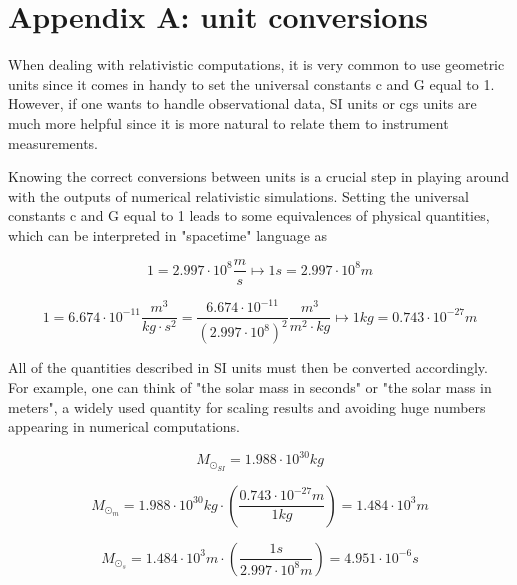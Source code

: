 \appendix
{}
\chapter*{Appendix A: unit conversions}\label{unit conv}

When dealing with relativistic computations, it is very common to use geometric units since it comes in handy to set the universal constants c and G equal to 1. However, if one wants to handle observational data, SI units or cgs units are much more helpful since it is more natural to relate them to instrument measurements.

Knowing the correct conversions between units is a crucial step in playing around with the outputs of numerical relativistic simulations. Setting  the universal constants c and G equal to 1 leads to some equivalences of physical quantities, which can be interpreted in "spacetime" language as
  
$$
1 = 2.997\cdot10^8 \frac{m}{s} \longmapsto 1s = 2.997\cdot10^8 m
$$

$$ 
1 = 6.674\cdot10^{-11} \frac{m^3}{kg \cdot s^2} = \frac{6.674\cdot10^{-11}}{\left( 2.997\cdot 10^8 \right)^2} \frac{m^3}{m^2 \cdot kg} \longmapsto 1kg = 0.743 \cdot 10^{-27}m
$$

All of the quantities described in SI units must then be converted accordingly. For example, one can think of "the solar mass in seconds" or "the solar mass in meters", a widely used quantity for scaling results and avoiding huge numbers appearing in numerical computations.

$$
M_{\odot_{SI}} = 1.988\cdot10^{30} kg
$$

$$
M_{\odot_{m}} = 1.988\cdot10^{30} kg \cdot \left( \frac{0.743\cdot 10^{-27}m}{1kg} \right) = 1.484 \cdot 10^{3} m
$$

$$
M_{\odot_{s}} = 1.484 \cdot 10^{3} m \cdot \left( \frac{1s}{2.997\cdot10^8 m} \right) = 4.951 \cdot 10^{-6} s
$$



